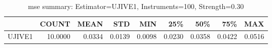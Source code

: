 \begin{table}[ht]
\centering
\caption{mse summary: Estimator=UJIVE1, Instruments=100, Strength=0.30}
\begin{tabular}{lrrrrrrrr}
\toprule
 & COUNT & MEAN & STD & MIN & 25\% & 50\% & 75\% & MAX \\
\midrule
UJIVE1 & 10.0000 & 0.0334 & 0.0139 & 0.0098 & 0.0230 & 0.0358 & 0.0422 & 0.0516 \\
\bottomrule
\end{tabular}
\end{table}
